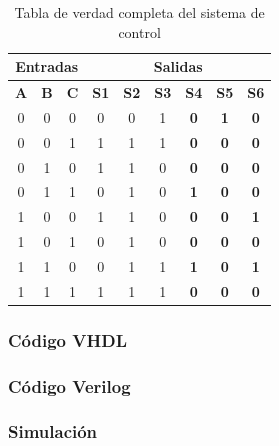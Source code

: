 \begin{table}[h!]
\centering
\caption{Tabla de verdad completa del sistema de control}
\begin{tabular}{|c|c|c||c|c|c||c|c|c|}
\hline
\multicolumn{3}{|c||}{\textbf{Entradas}} & \multicolumn{6}{c|}{\textbf{Salidas}} \\
\hline
\textbf{A} & \textbf{B} & \textbf{C} & \textbf{S1} & \textbf{S2} & \textbf{S3} & \textbf{S4} & \textbf{S5} & \textbf{S6} \\
\hline \hline
0 & 0 & 0 & 0 & 0 & 1 & \textbf{0} & \textbf{1} & \textbf{0} \\
\hline
0 & 0 & 1 & 1 & 1 & 1 & \textbf{0} & \textbf{0} & \textbf{0} \\
\hline
0 & 1 & 0 & 1 & 1 & 0 & \textbf{0} & \textbf{0} & \textbf{0} \\
\hline
0 & 1 & 1 & 0 & 1 & 0 & \textbf{1} & \textbf{0} & \textbf{0} \\
\hline
1 & 0 & 0 & 1 & 1 & 0 & \textbf{0} & \textbf{0} & \textbf{1} \\
\hline
1 & 0 & 1 & 0 & 1 & 0 & \textbf{0} & \textbf{0} & \textbf{0} \\
\hline
1 & 1 & 0 & 0 & 1 & 1 & \textbf{1} & \textbf{0} & \textbf{1} \\
\hline
1 & 1 & 1 & 1 & 1 & 1 & \textbf{0} & \textbf{0} & \textbf{0} \\
\hline
\end{tabular}
\end{table}


\subsubsection*{Código VHDL}



\subsubsection*{Código Verilog}



\subsubsection*{Simulación}

